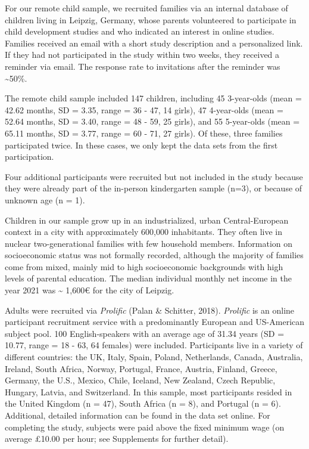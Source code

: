 \documentclass[
  man,floatsintext]{apa7}
\begin{document}
For our remote child sample, we recruited families via an internal database of children living in Leipzig, Germany, whose parents volunteered to participate in child development studies and who indicated an interest in online studies.
Families received an email with a short study description and a personalized link.
If they had not participated in the study within two weeks, they received a reminder via email.
The response rate to invitations after the reminder was \textasciitilde50\%.

The remote child sample included 147 children, including 45 3-year-olds (mean = 42.62 months, SD = 3.35, range = 36 - 47, 14 girls), 47 4-year-olds (mean = 52.64 months, SD = 3.40, range = 48 - 59, 25 girls), and 55 5-year-olds (mean = 65.11 months, SD = 3.77, range = 60 - 71, 27 girls).
Of these, three families participated twice.
In these cases, we only kept the data sets from the first participation.

Four additional participants were recruited but not included in the study because they were already part of the in-person kindergarten sample (n=3), or because of unknown age (n = 1).

Children in our sample grow up in an industrialized, urban Central-European context in a city with approximately 600,000 inhabitants.
They often live in nuclear two-generational families with few household members.
Information on socioeconomic status was not formally recorded, although the majority of families come from mixed, mainly mid to high socioeconomic backgrounds with high levels of parental education.
The median individual monthly net income in the year 2021 was \textasciitilde{} 1,600€ for the city of Leipzig.

Adults were recruited via \emph{Prolific} (Palan \& Schitter, 2018).
\emph{Prolific} is an online participant recruitment service with a predominantly European and US-American subject pool.
100 English-speakers with an average age of 31.34 years (SD = 10.77, range = 18 - 63, 64 females) were included.
Participants live in a variety of different countries: the UK, Italy, Spain, Poland, Netherlands, Canada, Australia, Ireland, South Africa, Norway, Portugal, France, Austria, Finland, Greece, Germany, the U.S., Mexico, Chile, Iceland, New Zealand, Czech Republic, Hungary, Latvia, and Switzerland.
In this sample, most participants resided in the United Kingdom (n = 47), South Africa (n = 8), and Portugal (n = 6).
Additional, detailed information can be found in the data set online.
For completing the study, subjects were paid above the fixed minimum wage (on average £10.00 per hour; see Supplements for further detail).
\end{document}
